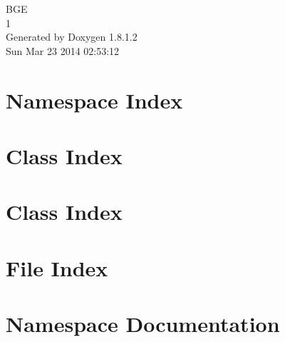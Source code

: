 \documentclass{book}
\begin{document}
\hypersetup{pageanchor=false,citecolor=blue}
\begin{titlepage}
\vspace*{7cm}
\begin{center}
{\Large B\-G\-E \\[1ex]\large 1 }\\
\vspace*{1cm}
{\large Generated by Doxygen 1.8.1.2}\\
\vspace*{0.5cm}
{\small Sun Mar 23 2014 02:53:12}\\
\end{center}
\end{titlepage}
\clearemptydoublepage
{}
\tableofcontents
\clearemptydoublepage
{}
\hypersetup{pageanchor=true,citecolor=blue}
\chapter{Namespace Index}

\chapter{Class Index}

\chapter{Class Index}

\chapter{File Index}

\chapter{Namespace Documentation}


\end{document}
